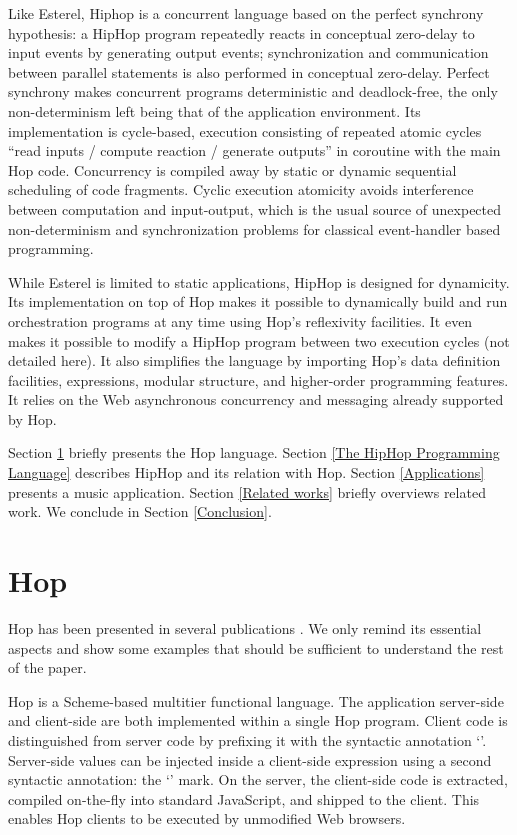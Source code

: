 \documentclass{llncs}
\begin{document}
Like Esterel, Hiphop is a concurrent language based on the perfect
synchrony hypothesis: a HipHop program repeatedly reacts in conceptual
zero-delay to input events by generating output events;
synchronization and communication between parallel statements is also
performed in conceptual zero-delay. Perfect synchrony makes concurrent
programs deterministic and deadlock-free, the only non-determinism
left being that of the application environment. Its implementation is
cycle-based, execution consisting of repeated atomic cycles ``read
inputs / compute reaction / generate outputs'' in coroutine with the main Hop code.
Concurrency is
compiled away by static or dynamic sequential scheduling of
code fragments.  Cyclic execution atomicity avoids interference between
computation and input-output, which is the usual source of unexpected
non-determinism and synchronization problems for 
classical event-handler based programming.

While Esterel is limited to static applications, HipHop is designed
for dynamicity.  Its implementation on top of Hop makes it possible to
dynamically build and run orchestration programs at any time using
Hop's reflexivity facilities. It even makes it possible to modify a
HipHop program between two execution cycles (not detailed here). 
It also simplifies the language by importing Hop's data definition facilities,
expressions, modular structure, and higher-order programming
features. It relies on the Web asynchronous concurrency and messaging 
already supported by Hop.

Section \ref{Hop} briefly presents the Hop language.
Section \ref{The HipHop Programming Language} describes
HipHop and its relation with Hop. Section \ref{Applications}
presents a music application. Section \ref{Related works} briefly overviews 
related work. We conclude in Section \ref{Conclusion}.

\section{Hop}
\label{Hop}

Hop has been presented in several publications
\cite{sgl:dls06,sb:cacm12}. We only remind its essential
aspects and show some examples that should be sufficient to understand
the rest of the paper.

Hop is a Scheme-based multitier functional language. The application server-side
and client-side are both implemented within a single Hop program.
Client code is distinguished from server code by prefixing it with the
syntactic annotation `{\texttt{{}}}'.  Server-side values can
be injected inside a client-side expression using a second
syntactic annotation: the `{\texttt{{}}}' mark.  On the server,
the client-side code is extracted, compiled on-the-fly into standard
JavaScript, and shipped to the client. This enables Hop clients to be
executed by unmodified Web browsers.
\end{document}
